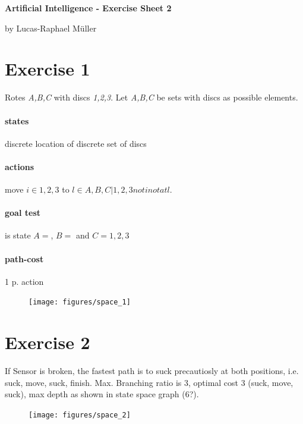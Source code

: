 \documentclass[11pt,a4paper,twoside]{article}
\begin{document}
\renewcommand\thesubsection{\alph{subsection})}

\lstset {
language = bash,
	breaklines = true,
	breakatwhitespace = true
}

\centerline{\LARGE \textbf{Artificial Intelligence - Exercise Sheet 2}}\vspace{0.5em}
\centerline{\large by Lucas-Raphael Müller}\vspace{2em}

\section*{Exercise 1}
Rotes \textit{A,B,C} with discs \textit{1,2,3}.
Let \textit{A,B,C} be sets with discs as possible elements.\\
\paragraph{states} discrete location of discrete set of discs
\paragraph{actions} move $i \in {1,2,3}$ to $l \in {A,B,C| {1,2,3} not i not at l}$.
\paragraph{goal test} is state $A = {}$, $B = {}$ and $C = {1,2,3}$
\paragraph{path-cost} 1 p. action

\begin{figure}[!hbtp]
	\centering
	\texttt{[image: figures/space\_1]}
	\label{gauss1}
\end{figure}

\FloatBarrier
\section*{Exercise 2}
If Sensor is broken, the fastest path is to suck precautiosly at both positions, i.e. suck, move, suck, finish.
Max. Branching ratio is 3, optimal cost 3 (suck, move, suck), max depth as shown in state space graph (6?).

\begin{figure}[!hbtp]
	\centering
	\texttt{[image: figures/space\_2]}
	\label{gauss1}
\end{figure}
\end{document}
